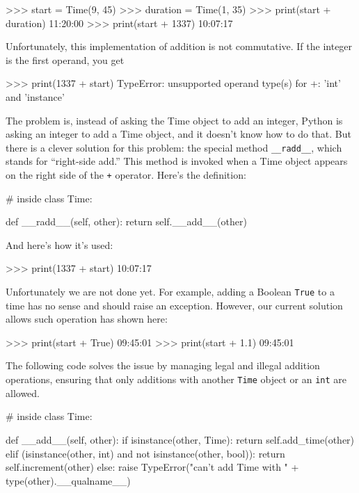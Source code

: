 \beforeverb
\begin{pyinterpreter}
>>> start = Time(9, 45)
>>> duration = Time(1, 35)
>>> print(start + duration)
11:20:00
>>> print(start + 1337)
10:07:17
\end{pyinterpreter}
\afterverb
%
Unfortunately, this implementation of addition is not commutative.
If the integer is the first operand, you get


\beforeverb
\begin{pyinterpreter}
>>> print(1337 + start)
TypeError: unsupported operand type(s) for +: 'int' and 'instance'
\end{pyinterpreter}
\afterverb
%
The problem is, instead of asking the Time object to add an integer,
Python is asking an integer to add a Time object, and it doesn't know
how to do that.  But there is a clever solution for this problem: the
special method \verb"__radd__", which stands for ``right-side add.''
This method is invoked when a Time object appears on the right side of
the {\tt +} operator.  Here's the definition:


\beforeverb
\begin{pycode}
# inside class Time:

    def __radd__(self, other):
        return self.__add__(other)
\end{pycode}
\afterverb
%
And here's how it's used:

\beforeverb
\begin{pyinterpreter}
>>> print(1337 + start)
10:07:17
\end{pyinterpreter}
\afterverb
%
Unfortunately we are not done yet. For example, adding a Boolean {\tt True} to 
a time has no sense and should raise an exception. However, our current solution 
allows such operation has shown here:

\beforeverb
\begin{pyinterpreter}
>>> print(start + True)
09:45:01
>>> print(start + 1.1)
09:45:01
\end{pyinterpreter}
\afterverb

The following code solves the issue by managing legal and illegal addition operations, ensuring that only additions with another {\tt Time} object or an {\tt int} are allowed.

\beforeverb
\begin{pycode}
# inside class Time:

    def __add__(self, other):
        if isinstance(other, Time):
            return self.add_time(other)
        elif (isinstance(other, int)
                  and not isinstance(other, bool)):
            return self.increment(other)
        else:
            raise TypeError("can't add Time with " +
                            type(other).__qualname__)
\end{pycode}
\afterverb

